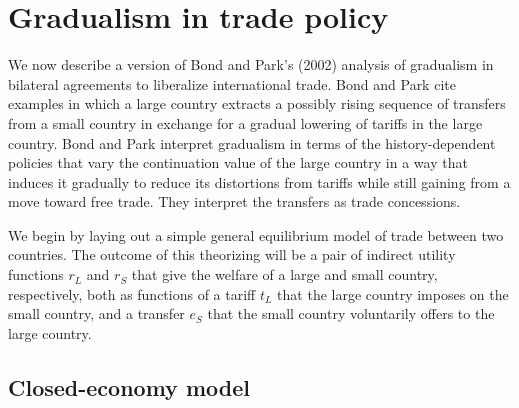 \section{Gradualism in trade policy}
We now describe a version of Bond and Park's (2002) analysis
of gradualism in bilateral agreements to liberalize international trade.
Bond and Park cite examples in which a large country extracts a possibly
rising sequence of transfers  from a small country in exchange for a gradual
lowering of tariffs in the large country.  Bond and Park interpret
gradualism in terms of the history-dependent policies that vary
the continuation value of the large country in a way that induces it gradually
to reduce its distortions from tariffs while still gaining from a move toward
free trade.  They interpret the transfers as trade concessions.

We begin by laying out a simple general equilibrium model of trade
between two countries. The outcome of this theorizing will be a
pair of indirect utility functions $r_L$ and $r_S$ that give the
welfare of a large and small country, respectively, both as
functions of a tariff $t_L$ that the large country imposes on the
small country, and a transfer $e_S$ that the small country
voluntarily offers to the large country.

\subsection{Closed-economy model}

